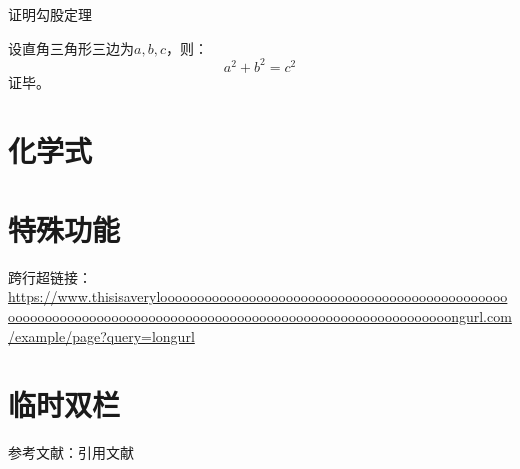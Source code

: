 \begin{prob}
证明勾股定理
\end{prob}
\begin{pf}
设直角三角形三边为$a,b,c$，则：
\[ a^2 + b^2 = c^2 \]
证毕。
\end{pf}

\section{化学式}







\section{特殊功能}
跨行超链接：\url{https://www.thisisaverylooooooooooooooooooooooooooooooooooooooooooooooooooooooooooooooooooooooooooooooooooooooooooooooooooooooooooongurl.com/example/page?query=longurl}

\entertwocolumn
\section{临时双栏}
\lipsum[1]
\exittwocolumn

参考文献：引用文献\parencite{chen2016xgboost}
